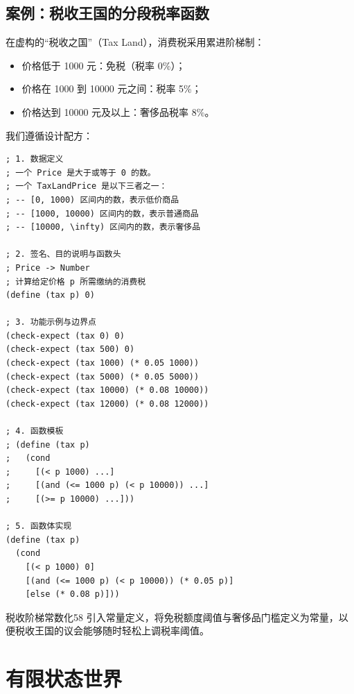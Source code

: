 \subsection{案例：税收王国的分段税率函数}

在虚构的“税收之国”（Tax Land），消费税采用累进阶梯制：
\begin{itemize}
  \item 价格低于 1000 元：免税（税率 0\%）；
  \item 价格在 1000 到 10000 元之间：税率 5\%；
  \item 价格达到 10000 元及以上：奢侈品税率 8\%。
\end{itemize}

我们遵循设计配方：

\begin{lstlisting}[language=BSL]
; 1. 数据定义
; 一个 Price 是大于或等于 0 的数。
; 一个 TaxLandPrice 是以下三者之一：
; -- [0, 1000) 区间内的数，表示低价商品
; -- [1000, 10000) 区间内的数，表示普通商品
; -- [10000, \infty) 区间内的数，表示奢侈品

; 2. 签名、目的说明与函数头
; Price -> Number
; 计算给定价格 p 所需缴纳的消费税
(define (tax p) 0)

; 3. 功能示例与边界点
(check-expect (tax 0) 0)
(check-expect (tax 500) 0)
(check-expect (tax 1000) (* 0.05 1000))
(check-expect (tax 5000) (* 0.05 5000))
(check-expect (tax 10000) (* 0.08 10000))
(check-expect (tax 12000) (* 0.08 12000))

; 4. 函数模板
; (define (tax p)
;   (cond
;     [(< p 1000) ...]
;     [(and (<= 1000 p) (< p 10000)) ...]
;     [(>= p 10000) ...]))

; 5. 函数体实现
(define (tax p)
  (cond
    [(< p 1000) 0]
    [(and (<= 1000 p) (< p 10000)) (* 0.05 p)]
    [else (* 0.08 p)]))
\end{lstlisting}

\begin{exercise}{税收阶梯常数化}{58}
引入常量定义，将免税额度阈值与奢侈品门槛定义为常量，以便税收王国的议会能够随时轻松上调税率阈值。
\end{exercise}

\section{有限状态世界}
\label{sec:4.7_finite_state_worlds}

